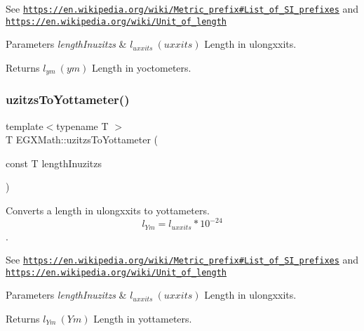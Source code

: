 See \href{https://en.wikipedia.org/wiki/Metric_prefix#List_of_SI_prefixes}{\tt https\+://en.\+wikipedia.\+org/wiki/\+Metric\+\_\+prefix\#\+List\+\_\+of\+\_\+\+S\+I\+\_\+prefixes} and \href{https://en.wikipedia.org/wiki/Unit_of_length}{\tt https\+://en.\+wikipedia.\+org/wiki/\+Unit\+\_\+of\+\_\+length} 
\begin{DoxyParams}{Parameters}
{\em length\+Inuzitzs} & $ l_{uxxits}\ (uxxits)$ Length in ulongxxits. \\
\hline
\end{DoxyParams}
\begin{DoxyReturn}{Returns}
$ l_{ym}\ (ym)$ Length in yoctometers. 
\end{DoxyReturn}
\mbox{\label{group___e_g_x_math-_conversions-_length_conversions-_non-_s_i-uzitzs-_s_i_gac20be4db1eed0397d7925d5b7148dd94}} 
\subsubsection{\texorpdfstring{uzitzs\+To\+Yottameter()}{uzitzsToYottameter()}}
{\footnotesize\ttfamily template$<$typename T $>$ \\
T E\+G\+X\+Math\+::uzitzs\+To\+Yottameter (\begin{DoxyParamCaption}\item[{const T}]{length\+Inuzitzs }\end{DoxyParamCaption})}



Converts a length in ulongxxits to yottameters. \[ l_{Ym}=l_{uxxits} * 10^{-24} \]. 

See \href{https://en.wikipedia.org/wiki/Metric_prefix#List_of_SI_prefixes}{\tt https\+://en.\+wikipedia.\+org/wiki/\+Metric\+\_\+prefix\#\+List\+\_\+of\+\_\+\+S\+I\+\_\+prefixes} and \href{https://en.wikipedia.org/wiki/Unit_of_length}{\tt https\+://en.\+wikipedia.\+org/wiki/\+Unit\+\_\+of\+\_\+length} 
\begin{DoxyParams}{Parameters}
{\em length\+Inuzitzs} & $ l_{uxxits}\ (uxxits)$ Length in ulongxxits. \\
\hline
\end{DoxyParams}
\begin{DoxyReturn}{Returns}
$ l_{Ym}\ (Ym)$ Length in yottameters. 
\end{DoxyReturn}
\mbox{\label{group___e_g_x_math-_conversions-_length_conversions-_non-_s_i-uzitzs-_s_i_ga9057f57c3f49216e6272c6f0f29ded62}} 
